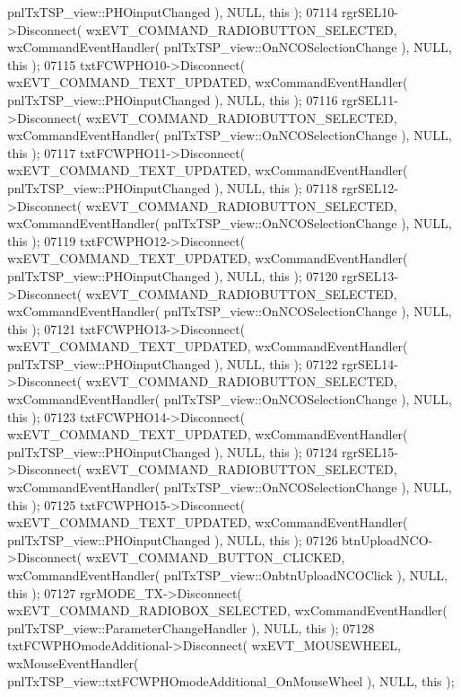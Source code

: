\begin{DoxyCode}
      pnlTxTSP_view::PHOinputChanged ), NULL, \textcolor{keyword}{this} );
07114     rgrSEL10->Disconnect( wxEVT\_COMMAND\_RADIOBUTTON\_SELECTED, wxCommandEventHandler( 
      pnlTxTSP_view::OnNCOSelectionChange ), NULL, \textcolor{keyword}{this} );
07115     txtFCWPHO10->Disconnect( wxEVT\_COMMAND\_TEXT\_UPDATED, wxCommandEventHandler( 
      pnlTxTSP_view::PHOinputChanged ), NULL, \textcolor{keyword}{this} );
07116     rgrSEL11->Disconnect( wxEVT\_COMMAND\_RADIOBUTTON\_SELECTED, wxCommandEventHandler( 
      pnlTxTSP_view::OnNCOSelectionChange ), NULL, \textcolor{keyword}{this} );
07117     txtFCWPHO11->Disconnect( wxEVT\_COMMAND\_TEXT\_UPDATED, wxCommandEventHandler( 
      pnlTxTSP_view::PHOinputChanged ), NULL, \textcolor{keyword}{this} );
07118     rgrSEL12->Disconnect( wxEVT\_COMMAND\_RADIOBUTTON\_SELECTED, wxCommandEventHandler( 
      pnlTxTSP_view::OnNCOSelectionChange ), NULL, \textcolor{keyword}{this} );
07119     txtFCWPHO12->Disconnect( wxEVT\_COMMAND\_TEXT\_UPDATED, wxCommandEventHandler( 
      pnlTxTSP_view::PHOinputChanged ), NULL, \textcolor{keyword}{this} );
07120     rgrSEL13->Disconnect( wxEVT\_COMMAND\_RADIOBUTTON\_SELECTED, wxCommandEventHandler( 
      pnlTxTSP_view::OnNCOSelectionChange ), NULL, \textcolor{keyword}{this} );
07121     txtFCWPHO13->Disconnect( wxEVT\_COMMAND\_TEXT\_UPDATED, wxCommandEventHandler( 
      pnlTxTSP_view::PHOinputChanged ), NULL, \textcolor{keyword}{this} );
07122     rgrSEL14->Disconnect( wxEVT\_COMMAND\_RADIOBUTTON\_SELECTED, wxCommandEventHandler( 
      pnlTxTSP_view::OnNCOSelectionChange ), NULL, \textcolor{keyword}{this} );
07123     txtFCWPHO14->Disconnect( wxEVT\_COMMAND\_TEXT\_UPDATED, wxCommandEventHandler( 
      pnlTxTSP_view::PHOinputChanged ), NULL, \textcolor{keyword}{this} );
07124     rgrSEL15->Disconnect( wxEVT\_COMMAND\_RADIOBUTTON\_SELECTED, wxCommandEventHandler( 
      pnlTxTSP_view::OnNCOSelectionChange ), NULL, \textcolor{keyword}{this} );
07125     txtFCWPHO15->Disconnect( wxEVT\_COMMAND\_TEXT\_UPDATED, wxCommandEventHandler( 
      pnlTxTSP_view::PHOinputChanged ), NULL, \textcolor{keyword}{this} );
07126     btnUploadNCO->Disconnect( wxEVT\_COMMAND\_BUTTON\_CLICKED, wxCommandEventHandler( 
      pnlTxTSP_view::OnbtnUploadNCOClick ), NULL, \textcolor{keyword}{this} );
07127     rgrMODE_TX->Disconnect( wxEVT\_COMMAND\_RADIOBOX\_SELECTED, wxCommandEventHandler( 
      pnlTxTSP_view::ParameterChangeHandler ), NULL, \textcolor{keyword}{this} );
07128     txtFCWPHOmodeAdditional->Disconnect( wxEVT\_MOUSEWHEEL, wxMouseEventHandler( 
      pnlTxTSP_view::txtFCWPHOmodeAdditional_OnMouseWheel ), NULL, \textcolor{keyword}{this} );

\end{DoxyCode}
